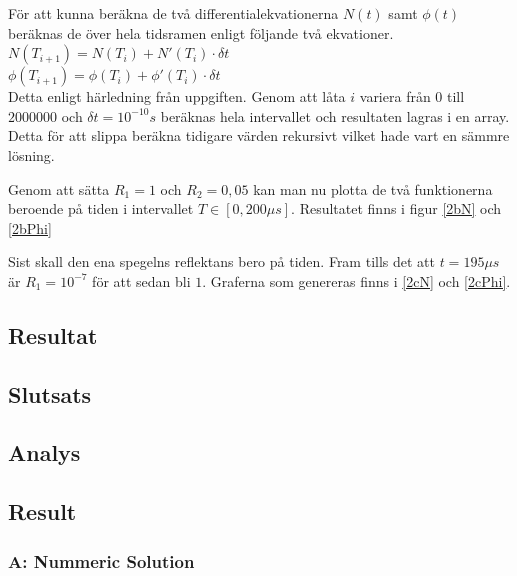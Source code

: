 \documentclass[12pt]{article}
\begin{document}
För att kunna beräkna de två differentialekvationerna $N(t)$ samt $\phi(t)$ beräknas de över hela tidsramen enligt följande två ekvationer.\\
$N(T_{i+1})=N(T_i)+N'(T_i) \cdot \delta t $\\
$\phi(T_{i+1})=\phi(T_i)+\phi'(T_i) \cdot \delta t $\\

Detta enligt härledning från uppgiften. Genom att låta $i$ variera från $0$ till $2000000$ och $\delta t=10^{-10}s$ beräknas hela intervallet och resultaten lagras i en array. Detta för att slippa beräkna tidigare värden rekursivt vilket hade vart en sämmre lösning.

Genom att sätta $R_1 = 1$ och $R_2 = 0,05$ kan man nu plotta de två funktionerna beroende på tiden i intervallet $T \in [0,200 \mu s]$. Resultatet finns i figur \ref{2bN} och \ref{2bPhi} 

Sist skall den ena spegelns reflektans bero på tiden. Fram tills det att $t=195 \mu s$ är $R_1=10^{-7}$ för att sedan bli $1$. Graferna som genereras finns i \ref{2cN} och \ref{2cPhi}.

\subsection{Resultat}

\subsection{Slutsats}

\subsection{Analys}


\subsection{Result}
\subsubsection{A: Nummeric Solution}
\end{document}

